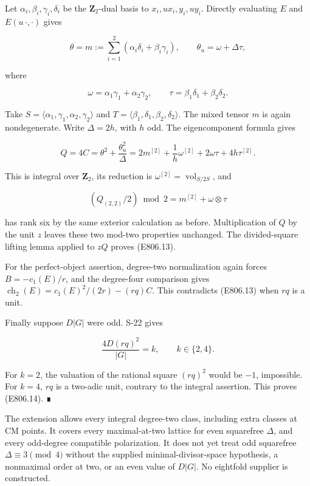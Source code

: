 Let \(\alpha_i,\beta_i,\gamma_i,\delta_i\) be the \(\mathbf Z_2\)-dual
basis to \(x_i,ux_i,y_i,uy_i\). Directly evaluating \(E\) and
\(E(u\,\cdot,\cdot)\) gives

\[
 \theta=m:=\sum_{i=1}^2(\alpha_i\delta_i+\beta_i\gamma_i),
 \qquad
 \theta_u=\omega+\Delta\tau,
 \tag{E806.16}
\]

where

\[
 \omega=\alpha_1\gamma_1+\alpha_2\gamma_2,\qquad
 \tau=\beta_1\delta_1+\beta_2\delta_2.
\]

Take \(S=\langle\alpha_1,\gamma_1,\alpha_2,\gamma_2\rangle\) and
\(T=\langle\beta_1,\delta_1,\beta_2,\delta_2\rangle\). The mixed tensor
\(m\) is again nondegenerate. Write \(\Delta=2h\), with \(h\) odd. The
eigencomponent formula gives

\[
 Q=4C=\theta^2+\frac{\theta_u^2}{\Delta}
   =2m^{[2]}+\frac1h\omega^{[2]}
          +2\omega\tau+4h\tau^{[2]}.
 \tag{E806.17}
\]

This is integral over \(\mathbf Z_2\), its reduction is
\(\omega^{[2]}=\operatorname{vol}_{S/2S}\), and

\[
 (Q_{(2,2)}/2)\bmod2=m^{[2]}+\omega\otimes\tau
\]

has rank six by the same exterior calculation as before. Multiplication
of \(Q\) by the unit \(z\) leaves these two mod-two properties
unchanged. The divided-square lifting lemma applied to \(zQ\) proves
(E806.13).

For the perfect-object assertion, degree-two normalization again forces
\(B=-c_1(E)/r\), and the degree-four comparison gives
\(\operatorname{ch}_2(E)=c_1(E)^2/(2r)-(rq)C\). This contradicts
(E806.13) when \(rq\) is a unit.

Finally suppose \(D|G|\) were odd. S-22 gives

\[
 \frac{4D(rq)^2}{|G|}=k,\qquad k\in\{2,4\}.
\]

For \(k=2\), the valuation of the rational square \((rq)^2\) would be
\(-1\), impossible. For \(k=4\), \(rq\) is a two-adic unit, contrary to
the integral assertion. This proves (E806.14). ∎

The extension allows every integral degree-two class, including extra
classes at CM points. It covers every maximal-at-two lattice for even
squarefree \(\Delta\), and every odd-degree compatible polarization. It
does not yet treat odd squarefree \(\Delta\equiv3\pmod4\) without the
supplied minimal-divisor-space hypothesis, a nonmaximal order at two, or
an even value of \(D|G|\). No eightfold supplier is constructed.
